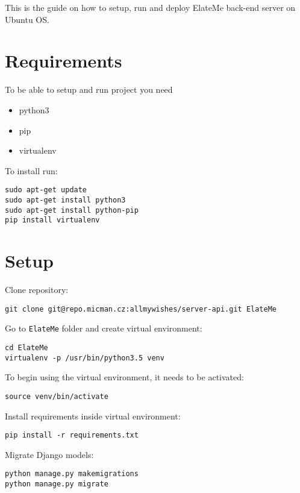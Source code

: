 This is the guide on how to setup, run and deploy ElateMe back-end
server on Ubuntu OS.
{\parindent0pt
\section*{Requirements}\label{requirements}

To be able to setup and run project you need

\begin{itemize}
\tightlist
\item
  python3
\item
  pip
\item
  virtualenv
\end{itemize}

To install run:

\begin{verbatim}
sudo apt-get update
sudo apt-get install python3
sudo apt-get install python-pip
pip install virtualenv
\end{verbatim}

\pagebreak

\section*{Setup}\label{setup}

Clone repository:

\begin{verbatim}
git clone git@repo.micman.cz:allmywishes/server-api.git ElateMe
\end{verbatim}

Go to \texttt{ElateMe} folder and create virtual environment:

\begin{verbatim}
cd ElateMe
virtualenv -p /usr/bin/python3.5 venv
\end{verbatim}

To begin using the virtual environment, it needs to be activated:

\begin{verbatim}
source venv/bin/activate
\end{verbatim}

Install requirements inside virtual environment:

\begin{verbatim}
pip install -r requirements.txt
\end{verbatim}

Migrate Django models:

\begin{verbatim}
python manage.py makemigrations
python manage.py migrate
\end{verbatim}

}
